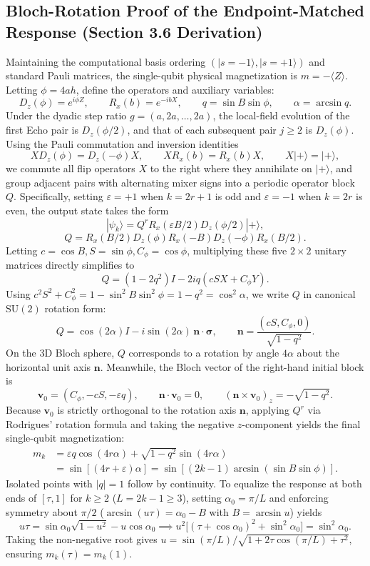 \documentclass{article}
\theoremstyle{plain}
\theoremstyle{definition}
\begin{document}
\subsection{Bloch-Rotation Proof of the Endpoint-Matched Response (Section 3.6 Derivation)}\label{subsec:a_4}

Maintaining the computational basis ordering $(|s=-1\rangle,|s=+1\rangle)$ and standard Pauli matrices, the single-qubit physical magnetization is $m=-\langle Z\rangle$. Letting $\phi=4ah$, define the operators and auxiliary variables:
\[
D_z(\phi)=e^{i\phi Z},\qquad R_x(b)=e^{-ibX},
\qquad q=\sin B\sin\phi,\qquad \alpha=\arcsin q.
\]
Under the dyadic step ratio $g=(a,2a,\ldots,2a)$, the local-field evolution of the first Echo pair is $D_z(\phi/2)$, and that of each subsequent pair $j\ge 2$ is $D_z(\phi)$. Using the Pauli commutation and inversion identities
\[
XD_z(\phi)=D_z(-\phi)X,\qquad
XR_x(b)=R_x(b)X,\qquad X|+\rangle=|+\rangle,
\]
we commute all flip operators $X$ to the right where they annihilate on $|+\rangle$, and group adjacent pairs with alternating mixer signs into a periodic operator block $Q$. Specifically, setting $\varepsilon=+1$ when $k=2r+1$ is odd and $\varepsilon=-1$ when $k=2r$ is even, the output state takes the form
\[
|\psi_k\rangle
=Q^rR_x(\varepsilon B/2)D_z(\phi/2)|+\rangle,
\]
\[
Q=R_x(B/2)D_z(\phi)R_x(-B)D_z(-\phi)R_x(B/2).
\]
Letting $c=\cos B, S=\sin\phi, C_\phi=\cos\phi$, multiplying these five $2\times 2$ unitary matrices directly simplifies to
\[
Q=(1-2q^2)I-2iq(cSX+C_\phi Y).
\]
Using $c^2S^2+C_\phi^2=1-\sin^2 B\sin^2\phi=1-q^2=\cos^2\alpha$, we write $Q$ in canonical $\mathrm{SU}(2)$ rotation form:
\[
Q=\cos(2\alpha)I-i\sin(2\alpha)\,\boldsymbol n\cdot\boldsymbol\sigma,
\qquad
\boldsymbol n=\frac{(cS,C_\phi,0)}{\sqrt{1-q^2}}.
\]
On the 3D Bloch sphere, $Q$ corresponds to a rotation by angle $4\alpha$ about the horizontal unit axis $\boldsymbol n$. Meanwhile, the Bloch vector of the right-hand initial block is
\[
\boldsymbol v_0=(C_\phi,-cS,-\varepsilon q),
\qquad \boldsymbol n\cdot\boldsymbol v_0=0,
\qquad (\boldsymbol n\times\boldsymbol v_0)_z=-\sqrt{1-q^2}.
\]
Because $\boldsymbol v_0$ is strictly orthogonal to the rotation axis $\boldsymbol n$, applying $Q^r$ via Rodrigues' rotation formula and taking the negative $z$-component yields the final single-qubit magnetization:
\[
\begin{aligned}
m_k
&=\varepsilon q\cos(4r\alpha)+\sqrt{1-q^2}\sin(4r\alpha)\\
&=\sin[(4r+\varepsilon)\alpha]
=\sin[(2k-1)\arcsin(\sin B\sin\phi)].
\end{aligned}
\]
Isolated points with $|q|=1$ follow by continuity. To equalize the response at both ends of $[\tau,1]$ for $k\ge 2$ ($L=2k-1\ge 3$), setting $\alpha_0=\pi/L$ and enforcing symmetry about $\pi/2$ ($\arcsin(u\tau)=\alpha_0-B$ with $B=\arcsin u$) yields
\[
u\tau=\sin\alpha_0\sqrt{1-u^2}-u\cos\alpha_0
\implies
u^2\big[(\tau+\cos\alpha_0)^2+\sin^2\alpha_0\big]
=\sin^2\alpha_0.
\]
Taking the non-negative root gives $u=\sin(\pi/L)/\sqrt{1+2\tau\cos(\pi/L)+\tau^2}$, ensuring $m_k(\tau)=m_k(1)$.
\end{document}
